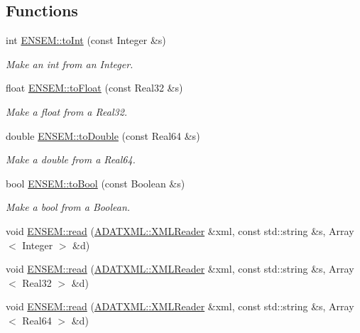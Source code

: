 \subsection*{Functions}
\begin{DoxyCompactItemize}
\item 
int \mbox{\hyperlink{namespaceENSEM_ada64466467bc2ca84cb2b64dffa8dd02}{E\+N\+S\+E\+M\+::to\+Int}} (const Integer \&s)
\begin{DoxyCompactList}\small\item\em Make an int from an Integer. \end{DoxyCompactList}\item 
float \mbox{\hyperlink{namespaceENSEM_a109a3e3e759ebd30afae927366900cd6}{E\+N\+S\+E\+M\+::to\+Float}} (const Real32 \&s)
\begin{DoxyCompactList}\small\item\em Make a float from a Real32. \end{DoxyCompactList}\item 
double \mbox{\hyperlink{namespaceENSEM_ac48f5951452a687d3b08acfd4b10d874}{E\+N\+S\+E\+M\+::to\+Double}} (const Real64 \&s)
\begin{DoxyCompactList}\small\item\em Make a double from a Real64. \end{DoxyCompactList}\item 
bool \mbox{\hyperlink{namespaceENSEM_abc04e0e08f1aeecdaca3de8b916ac697}{E\+N\+S\+E\+M\+::to\+Bool}} (const Boolean \&s)
\begin{DoxyCompactList}\small\item\em Make a bool from a Boolean. \end{DoxyCompactList}\item 
void \mbox{\hyperlink{namespaceENSEM_a59df78af1e673ccefd2496b40ffcebac}{E\+N\+S\+E\+M\+::read}} (\mbox{\hyperlink{classADATXML_1_1XMLReader}{A\+D\+A\+T\+X\+M\+L\+::\+X\+M\+L\+Reader}} \&xml, const std\+::string \&s, Array$<$ Integer $>$ \&d)
\item 
void \mbox{\hyperlink{namespaceENSEM_a35ede464f1c4210bc6236f281a40ee73}{E\+N\+S\+E\+M\+::read}} (\mbox{\hyperlink{classADATXML_1_1XMLReader}{A\+D\+A\+T\+X\+M\+L\+::\+X\+M\+L\+Reader}} \&xml, const std\+::string \&s, Array$<$ Real32 $>$ \&d)
\item 
void \mbox{\hyperlink{namespaceENSEM_ae92990139593325dd95e78b0bc6aa89d}{E\+N\+S\+E\+M\+::read}} (\mbox{\hyperlink{classADATXML_1_1XMLReader}{A\+D\+A\+T\+X\+M\+L\+::\+X\+M\+L\+Reader}} \&xml, const std\+::string \&s, Array$<$ Real64 $>$ \&d)

\end{DoxyCompactItemize}
